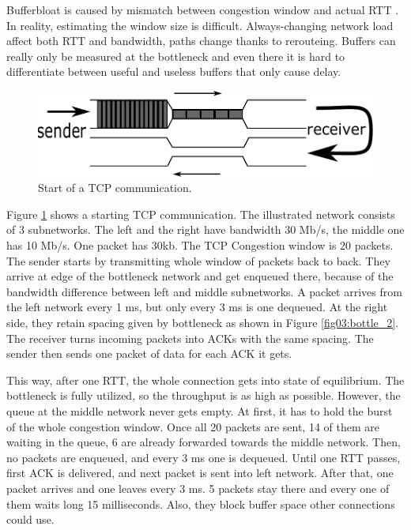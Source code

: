 


Bufferbloat is caused by mismatch between congestion window and actual RTT \cite{CoDel}. In reality, estimating the window size is difficult. Always-changing network load affect both RTT and bandwidth, paths change thanks to rerouteing. Buffers can really only be measured at the bottleneck and even there it is hard to differentiate between useful and useless buffers that only cause delay.

\begin{figure}
	\centering
	\includegraphics[width=137mm]{drawings/tcp_bottleneck_1}
	\caption{Start of a TCP communication.}
	
	\label{fig02:bottle_1}
\end{figure}


Figure \ref{fig02:bottle_1} shows a starting TCP communication. The illustrated network consists of 3 subnetworks. The left and the right have bandwidth 30 Mb/s, the middle one has 10 Mb/s. One packet has 30kb. The TCP Congestion window is 20 packets. The sender starts by transmitting whole window of packets back to back. They arrive at edge of the bottleneck network and get enqueued there, because of the bandwidth difference between left and middle subnetworks. A packet arrives from the left network every 1 ms, but only every 3 ms is one dequeued. At the right side, they retain spacing given by bottleneck as shown in Figure \ref{fig03:bottle_2}. The receiver turns incoming packets into ACKs with the same spacing. The sender then sends one packet of data for each ACK it gets.

This way, after one RTT, the whole connection gets into state of equilibrium. The bottleneck is fully utilized, so the throughput is as high as possible. However, the queue at the middle network never gets empty. At first, it has to hold the burst of the whole congestion window. Once all 20 packets are sent, 14 of them are waiting in the queue, 6 are already forwarded towards the middle network. Then, no packets are enqueued, and every 3 ms one is dequeued. Until one RTT passes, first ACK is delivered, and next packet is sent into left network. After that, one packet arrives and one leaves every 3 ms. 5 packets stay there and every one of them waits long 15 milliseconds. Also, they block buffer space other connections could use. 

